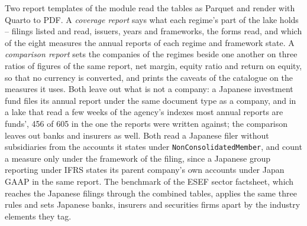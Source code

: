 Two report templates of the module read the tables as Parquet and render with Quarto to PDF. A \emph{coverage report} says what each regime's part of the lake holds -- filings listed and read, issuers, years and frameworks, the forms read, and which of the eight measures the annual reports of each regime and framework state. A \emph{comparison report} sets the companies of the regimes beside one another on three ratios of figures of the same report, net margin, equity ratio and return on equity, so that no currency is converted, and prints the caveats of the catalogue on the measures it uses. Both leave out what is not a company: a Japanese investment fund files its annual report under the same document type as a company, and in a lake that read a few weeks of the agency's indexes most annual reports are funds', 456 of 605 in the one the reports were written against; the comparison leaves out banks and insurers as well. Both read a Japanese filer without subsidiaries from the accounts it states under \verb|NonConsolidatedMember|, and count a measure only under the framework of the filing, since a Japanese group reporting under IFRS states its parent company's own accounts under Japan GAAP in the same report. The benchmark of the ESEF sector factsheet, which reaches the Japanese filings through the combined tables, applies the same three rules and sets Japanese banks, insurers and securities firms apart by the industry elements they tag.

